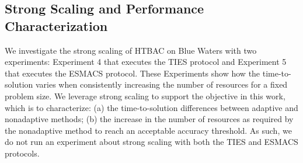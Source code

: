 



\subsection{Strong Scaling and Performance Characterization}

We investigate the strong scaling of HTBAC on Blue Waters with two
experiments: Experiment 4 that executes the TIES protocol and Experiment 5
that executes the ESMACS protocol.  These Experiments show how the
time-to-solution varies when consistently increasing the number of resources
for a fixed problem size. We leverage strong scaling to support the objective
in this work, which is to characterize: (a) the time-to-solution differences
between adaptive and nonadaptive methods; (b) the increase in the number of
resources as required by the nonadaptive method to reach an acceptable
accuracy threshold. As such, we do not run an experiment about strong scaling
with both the TIES and ESMACS protocols.

